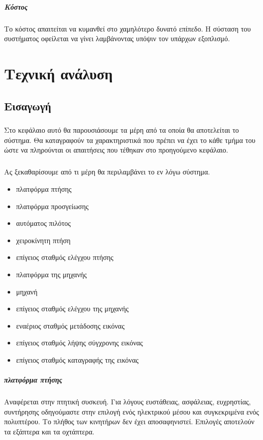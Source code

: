 \documentclass[a4paper, 12pt, twoside]{report}
\begin{document}
{{{{{ 			\paragraph{Κόστος}{Το κόστος απαιτείται να κυμανθεί στο χαμηλότερο δυνατό επίπεδο. Η σύσταση του συστήματος οφείλεται να γίνει λαμβάνοντας υπόψιν τον υπάρχων εξοπλισμό.
 			
 	\chapter{Τεχνική ανάλυση}
		\section{Εισαγωγή}
			\paragraph{}{Στο κεφάλαιο αυτό θα παρουσιάσουμε τα μέρη από τα οποία θα αποτελείται το σύστημα. Θα καταγραφούν τα χαρακτηριστικά που πρέπει να έχει το κάθε τμήμα του ώστε να πληρούνται οι απαιτήσεις που τέθηκαν στο προηγούμενο κεφάλαιο.
			}
			
			\paragraph{}{Ας ξεκαθαρίσουμε από τι μέρη θα περιλαμβάνει το εν λόγω σύστημα.
			\begin{itemize}
				\item πλατφόρμα πτήσης
				\item πλατφόρμα προσγείωσης
				\item αυτόματος πιλότος
				\item χειροκίνητη πτήση
				\item επίγειος σταθμός ελέγχου πτήσης
				\item πλατφόρμα της μηχανής
				\item μηχανή
				\item επίγειος σταθμός ελέγχου της μηχανής
				\item εναέριος σταθμός μετάδοσης εικόνας
				\item επίγειος σταθμός λήψης σύγχρονης εικόνας
				\item επίγειος σταθμός καταγραφής της εικόνας
			\end{itemize}
			}
			
			\paragraph{πλατφόρμα πτήσης}{Αναφέρεται στην πτητική συσκευή. Για λόγους ευστάθειας, ασφάλειας, ευχρηστίας, συντήρησης οδηγούμαστε στην επιλογή ενός ηλεκτρικού μέσου και συγκεκριμένα ενός πολυπτέρου. Το πλήθος των κινητήρων δεν έχει αποσαφηνιστεί. Επιλογές αποτελούν τα εξάπτερα και τα οχτάπτερα.
			}
}}}}}}
\end{document}
